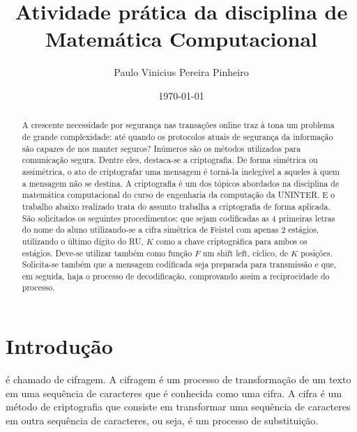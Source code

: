 \documentclass[a4paper,pra,aps,twocolumn,superscriptaddress,10pt]{revtex4-2}
\begin{document}
\title{Atividade prática da disciplina de Matemática Computacional}

\author{Paulo Vinicius Pereira Pinheiro}

\date{\today}

\begin{abstract}
    A crescente necessidade por segurança nas transações online traz à tona um problema de grande complexidade: até quando os protocolos atuais de segurança da informação são capazes de nos manter seguros? Inúmeros são os métodos utilizados para comunicação segura. Dentre eles, destaca-se a criptografia. De forma simétrica ou assimétrica, o ato de criptografar uma mensagem é torná-la inelegível a aqueles à quem a mensagem não se destina. A criptografia é um dos tópicos abordados na disciplina de matemática computacional do curso de engenharia da computação da UNINTER. E o trabalho abaixo realizado trata do assunto trabalha a criptografia de forma aplicada. São solicitados os seguintes procedimentos: que sejam codificadas as 4 primeiras letras do nome do aluno utilizando-se a cifra simétrica de Feistel com apenas 2 estágios, utilizando o último dígito do RU, $K$ como a chave criptográfica para ambos os estágios. Deve-se utilizar também como função $F$ um shift left, cíclico, de $K$ posições. Solicita-se também que a mensagem codificada seja preparada para transmissão e que, em seguida, haja o processo de decodificação, comprovando assim a reciprocidade do processo.
    
    
\end{abstract}

\maketitle


\section{Introdução}

    \lipsum[2-4]

    é chamado de cifragem. A cifragem é um processo de transformação de um texto em uma sequência de caracteres que é conhecida como uma cifra. A cifra é um método de criptografia que consiste em transformar uma sequência de caracteres em outra sequência de caracteres, ou seja, é um processo de substituição.
\end{document}
